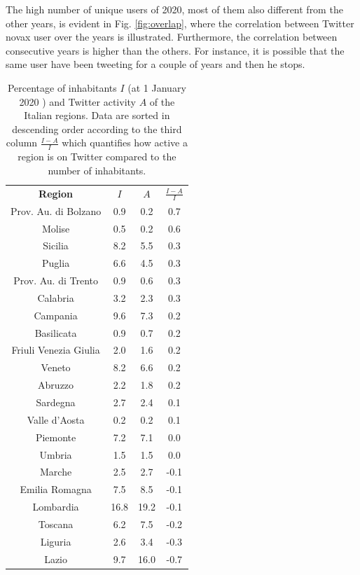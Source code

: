 \documentclass[prb,twocolumn,9pt]{revtex4-1}
\begin{document}
The high number of unique users of 2020, most of them also different from the other years, is evident in Fig. \ref{fig:overlap}, where the correlation between Twitter novax user over the years is illustrated. 
Furthermore, the correlation between consecutive years is higher than the others. For instance, it is possible that the same user have been tweeting for a couple of years and then he stops.



 \begin{table}[b]
    \begin{minipage}[l]{1.0\columnwidth}
    \centering
        \begin{tabular*}{\linewidth}{@{\extracolsep{\fill}} c c c c}
       \textbf{Region}	&	\textbf{$I$}	&	\textbf{$A$} &	\textbf{$\frac{I- A}{I}$}	\\
 \colrule
Prov. Au. di Bolzano	&	0.9	&	0.2	&	0.7	\\
Molise	&	0.5	&	0.2	&	0.6	\\
Sicilia	&	8.2	&	5.5	&	0.3	\\
Puglia	&	6.6	&	4.5	&	0.3	\\
Prov. Au. di Trento	&	0.9	&	0.6	&	0.3	\\
Calabria	&	3.2	&	2.3	&	0.3	\\
Campania	&	9.6	&	7.3	&	0.2	\\
Basilicata	&	0.9	&	0.7	&	0.2	\\
Friuli Venezia Giulia	&	2.0	&	1.6	&	0.2	\\
Veneto	&	8.2	&	6.6	&	0.2	\\
Abruzzo	&	2.2	&	1.8	&	0.2	\\
Sardegna	&	2.7	&	2.4	&	0.1	\\
Valle d'Aosta	&	0.2	&	0.2	&	0.1	\\
Piemonte	&	7.2	&	7.1	&	0.0	\\
Umbria	&	1.5	&	1.5	&	0.0	\\
Marche	&	2.5	&	2.7	&	-0.1	\\
Emilia Romagna	&	7.5	&	8.5	&	-0.1	\\
Lombardia	&	16.8	&	19.2	&	-0.1	\\
Toscana	&	6.2	&	7.5	&	-0.2	\\
Liguria	&	2.6	&	3.4	&	-0.3	\\
Lazio	&	9.7	&	16.0	&	-0.7	\\

        \end{tabular*}
    \caption{Percentage of inhabitants $I$ (at 1 January 2020 \cite{istat}) and Twitter activity $A$ of the Italian regions. Data are sorted in descending order according to the third column $\frac{I- A}{I}$ which quantifies how active a region is on Twitter compared to the number of inhabitants.}
    \label{tab:inhab-activity}
    \end{minipage}
    \end{table}
\end{document}
